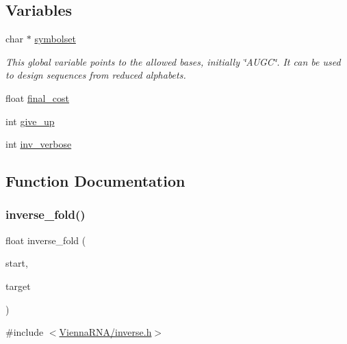 \subsection*{Variables}
\begin{DoxyCompactItemize}
\item 
char $\ast$ \mbox{\hyperlink{group__inverse__fold_ga8f791e7740a5a28b9f6fafb4e60301d9}{symbolset}}
\begin{DoxyCompactList}\small\item\em This global variable points to the allowed bases, initially \char`\"{}\+A\+U\+G\+C\char`\"{}. It can be used to design sequences from reduced alphabets. \end{DoxyCompactList}\item 
float \mbox{\hyperlink{group__inverse__fold_ga7f17d3b169af048d32bb185039a9c09c}{final\+\_\+cost}}
\item 
int \mbox{\hyperlink{group__inverse__fold_ga7ec4ba51f86e1717a1e174264e4a75ce}{give\+\_\+up}}
\item 
int \mbox{\hyperlink{group__inverse__fold_gafcfc65fba01b9cca5946726ed9057a63}{inv\+\_\+verbose}}
\end{DoxyCompactItemize}


\subsection{Function Documentation}
\mbox{\label{group__inverse__fold_ga7af026de55d4babad879f2c92559cbbc}} 
\subsubsection{\texorpdfstring{inverse\+\_\+fold()}{inverse\_fold()}}
{\footnotesize\ttfamily float inverse\+\_\+fold (\begin{DoxyParamCaption}\item[{char $\ast$}]{start,  }\item[{const char $\ast$}]{target }\end{DoxyParamCaption})}



{\ttfamily \#include $<$\mbox{\hyperlink{inverse_8h}{Vienna\+R\+N\+A/inverse.\+h}}$>$}



